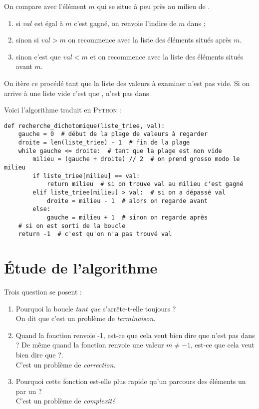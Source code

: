 \begin{methode}[]
On compare  avec l'élément $m$ qui se situe \og à peu près au milieu de \fg{}.
\begin{enumerate}[--]
    \item   si $val$ est égal à $m$ c'est gagné, on renvoie l'indice de $m$ dans  ;
    \item   sinon si $val>m$ on recommence avec la liste des éléments situés après $m$.
    \item   sinon c'est que $val<m$ et on recommence avec la liste des éléments situés avant $m$.
\end{enumerate}
On itère ce procédé tant que la liste des valeurs à examiner n'est pas vide. Si on arrive à une liste vide c'est que  , n'est pas dans 
\end{methode}
Voici l'algorithme traduit en \textsc{Python} :
\begin{pys}
\begin{verbatim}
def recherche_dichotomique(liste_triee, val):
    gauche = 0  # début de la plage de valeurs à regarder
    droite = len(liste_triee) - 1  # fin de la plage
    while gauche <= droite:  # tant que la plage est non vide
        milieu = (gauche + droite) // 2  # on prend grosso modo le milieu
        if liste_triee[milieu] == val:
            return milieu  # si on trouve val au milieu c'est gagné
        elif liste_triee[milieu] > val:  # si on a dépassé val
            droite = milieu - 1  # alors on regarde avant
        else:
            gauche = milieu + 1  # sinon on regarde après
    # si on est sorti de la boucle
    return -1  # c'est qu'on n'a pas trouvé val
\end{verbatim}
\end{pys}

\section{\'Etude de l'algorithme}

Trois question se posent :

\begin{enumerate}[\bfseries 1.]
    \item   Pourquoi la boucle \textit{tant que} s'arrête-t-elle toujours ?\\ On dit que c'est un problème de \textit{terminaison}.
    \item   Quand la fonction renvoie -1, est-ce que cela veut bien dire que  n'est pas dans  ? De même quand la fonction renvoie une valeur $m\neq -1$, est-ce que cela veut bien dire que  ?.\\
    C'est un problème de \textit{correction}.
    \item   Pourquoi cette fonction est-elle plus rapide qu'un parcours des éléments un par un ?\\ C'est un problème de \textit{complexité}
\end{enumerate}

